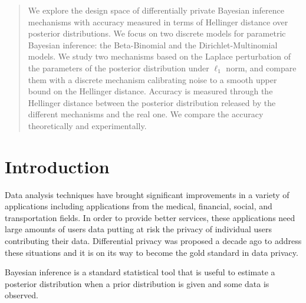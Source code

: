 \documentclass{article}
\begin{document}
\begin{abstract}
We explore the design space of differentially private Bayesian
inference mechanisms with accuracy measured in terms of Hellinger
distance over posterior distributions.  
We focus on two discrete models for parametric Bayesian
inference: the Beta-Binomial and the Dirichlet-Multinomial
models. We study two mechanisms based on the 
Laplace perturbation of the parameters of the posterior distribution under
$\ell_1$ norm, and compare them with a discrete mechanism
calibrating noise to a smooth upper bound on the Hellinger distance.
Accuracy is measured through the Hellinger distance between the posterior
distribution released by the different mechanisms and the real one.
We compare the accuracy theoretically and experimentally.
\end{abstract}





\section{Introduction}
\label{sec_intro}
Data analysis techniques have brought significant improvements in a
variety of applications including applications from the medical,
financial, social, and transportation fields. In order to provide
better services, these applications need large amounts of users data
putting at risk the privacy of individual users contributing their data. 
Differential privacy was proposed a decade ago to address these
situations and it is on its way to become the gold standard in data
privacy.  

Bayesian inference is a standard statistical tool that is useful to
estimate a posterior distribution when a prior distribution is given
and some data is observed. 
\end{document}
